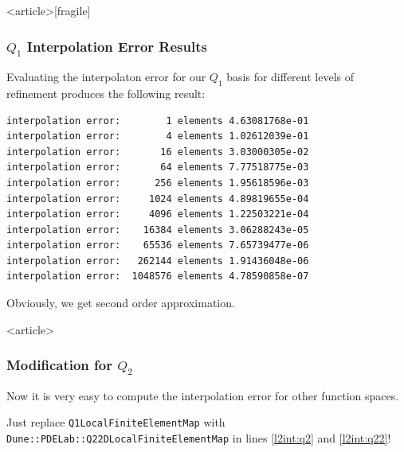 \begin{frame}<article>[fragile]
\frametitle{$Q_1$ Interpolation Error Results}
Evaluating the interpolaton error for our $Q_1$ basis for different
levels of refinement produces the following result:
\begin{lstlisting}[basicstyle=\scriptsize]
interpolation error:        1 elements 4.63081768e-01
interpolation error:        4 elements 1.02612039e-01
interpolation error:       16 elements 3.03000305e-02
interpolation error:       64 elements 7.77518775e-03
interpolation error:      256 elements 1.95618596e-03
interpolation error:     1024 elements 4.89819655e-04
interpolation error:     4096 elements 1.22503221e-04
interpolation error:    16384 elements 3.06288243e-05
interpolation error:    65536 elements 7.65739477e-06
interpolation error:   262144 elements 1.91436048e-06
interpolation error:  1048576 elements 4.78590858e-07
\end{lstlisting}
Obviously, we get second order approximation.
\end{frame}

\begin{frame}<article>
\frametitle{Modification for $Q_2$}
Now it is very easy to compute the interpolation error for other
function spaces.

Just replace \lstinline{Q1LocalFiniteElementMap}
with \lstinline{Dune::PDELab::Q22DLocalFiniteElementMap} in
lines \ref{l2int:q2} and \ref{l2int:q22}!
\end{frame}

%

